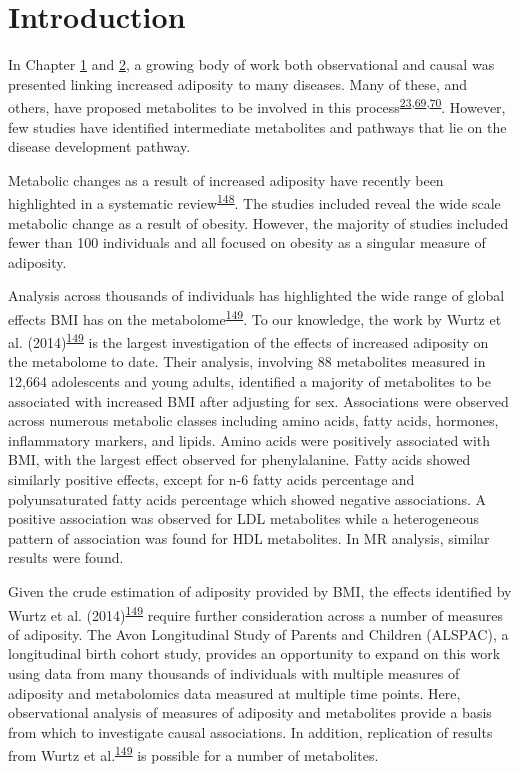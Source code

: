 \documentclass[11pt,twoside]{bristolthesis}
\begin{document}
\newpage

\hypertarget{introduction}{%
\section{Introduction}\label{introduction}}

In Chapter \protect\hyperlink{chapter1}{1} and \protect\hyperlink{chapter2}{2}, a growing body of work both observational and causal was presented linking increased adiposity to many diseases. Many of these, and others, have proposed metabolites to be involved in this process\textsuperscript{\protect\hyperlink{ref-Collaboration2009}{23},\protect\hyperlink{ref-Bray2004}{69},\protect\hyperlink{ref-Haslam2005}{70}}. However, few studies have identified intermediate metabolites and pathways that lie on the disease development pathway.

Metabolic changes as a result of increased adiposity have recently been highlighted in a systematic review\textsuperscript{\protect\hyperlink{ref-Rangel-Huerta2019}{148}}. The studies included reveal the wide scale metabolic change as a result of obesity. However, the majority of studies included fewer than 100 individuals and all focused on obesity as a singular measure of adiposity.

Analysis across thousands of individuals has highlighted the wide range of global effects BMI has on the metabolome\textsuperscript{\protect\hyperlink{ref-Wurtz2014}{149}}. To our knowledge, the work by Wurtz et al. (2014)\textsuperscript{\protect\hyperlink{ref-Wurtz2014}{149}} is the largest investigation of the effects of increased adiposity on the metabolome to date. Their analysis, involving 88 metabolites measured in 12,664 adolescents and young adults, identified a majority of metabolites to be associated with increased BMI after adjusting for sex. Associations were observed across numerous metabolic classes including amino acids, fatty acids, hormones, inflammatory markers, and lipids. Amino acids were positively associated with BMI, with the largest effect observed for phenylalanine. Fatty acids showed similarly positive effects, except for n-6 fatty acids percentage and polyunsaturated fatty acids percentage which showed negative associations. A positive association was observed for LDL metabolites while a heterogeneous pattern of association was found for HDL metabolites. In MR analysis, similar results were found.

Given the crude estimation of adiposity provided by BMI, the effects identified by Wurtz et al. (2014)\textsuperscript{\protect\hyperlink{ref-Wurtz2014}{149}} require further consideration across a number of measures of adiposity. The Avon Longitudinal Study of Parents and Children (ALSPAC), a longitudinal birth cohort study, provides an opportunity to expand on this work using data from many thousands of individuals with multiple measures of adiposity and metabolomics data measured at multiple time points. Here, observational analysis of measures of adiposity and metabolites provide a basis from which to investigate causal associations. In addition, replication of results from Wurtz et al.\textsuperscript{\protect\hyperlink{ref-Wurtz2014}{149}} is possible for a number of metabolites.
\end{document}
